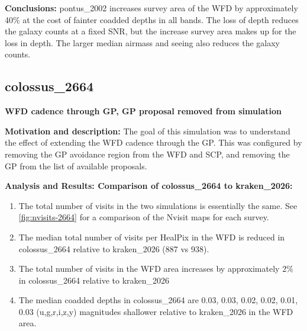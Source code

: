 \documentclass[DM,lsstdraft,authoryear,toc]{lsstdoc}
\begin{document}
\textbf{Conclusions:} pontus\_2002 increases survey area of the WFD by approximately 40$\%$ at the cost of fainter coadded depths in 
all bands. The loss of depth reduces the galaxy counts at a fixed SNR, but the increase survey area makes up for the loss in depth. The
larger median airmass and seeing also reduces the galaxy counts.

\subsection{colossus\_2664} \label{colossus2664}

\textbf{WFD cadence through GP, GP proposal removed from simulation}

\textbf{Motivation and description:} The goal of this simulation was to understand the effect of extending the
WFD cadence through the GP. This was configured by removing the GP avoidance region from the WFD
and SCP, and removing the GP from the list of available proposals.

\textbf{Analysis and Results: Comparison of colossus\_2664 to kraken\_2026:}

\begin{enumerate}
\item The total number of visits in the two simulations is essentially the same. See \autoref{fig:nvisits-2664}
for a comparison of the Nvisit maps for each survey.
\item The median total number of visits per HealPix in the WFD is reduced in colossus\_2664  relative to kraken\_2026 (887 vs 938).
\item The total number of visits in the WFD area increases by approximately 2$\%$ in colossus\_2664 relative to kraken\_2026
\item The median coadded depths in colossus\_2664 are 0.03, 0.03, 0.02, 0.02, 0.01, 0.03 (u,g,r,i,z,y) magnitudes shallower relative 
to kraken\_2026 in the WFD area.
\end{enumerate}
\end{document}
